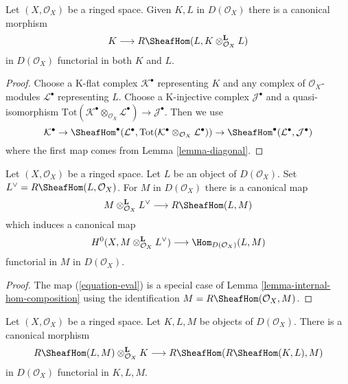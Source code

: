\begin{lemma}
\label{lemma-internal-hom-diagonal}
Let $(X, \mathcal{O}_X)$ be a ringed space. Given $K, L$ in $D(\mathcal{O}_X)$
there is a canonical morphism
$$
K \longrightarrow R\SheafHom(L, K \otimes_{\mathcal{O}_X}^\mathbf{L} L)
$$
in $D(\mathcal{O}_X)$ functorial in both $K$ and $L$.
\end{lemma}

\begin{proof}
Choose a K-flat complex $\mathcal{K}^\bullet$ representing $K$
and any complex of $\mathcal{O}_X$-modules $\mathcal{L}^\bullet$
representing $L$. Choose a K-injective complex $\mathcal{J}^\bullet$
and a quasi-isomorphism
$\text{Tot}(\mathcal{K}^\bullet \otimes_{\mathcal{O}_X} \mathcal{L}^\bullet)
\to \mathcal{J}^\bullet$. Then we use
$$
\mathcal{K}^\bullet \to
\SheafHom^\bullet(\mathcal{L}^\bullet,
\text{Tot}(\mathcal{K}^\bullet \otimes_{\mathcal{O}_X} \mathcal{L}^\bullet))
\to
\SheafHom^\bullet(\mathcal{L}^\bullet, \mathcal{J}^\bullet)
$$
where the first map comes from Lemma \ref{lemma-diagonal}.
\end{proof}

\begin{lemma}
\label{lemma-dual}
Let $(X, \mathcal{O}_X)$ be a ringed space. Let $L$ be an
object of $D(\mathcal{O}_X)$. Set $L^\vee = R\SheafHom(L, \mathcal{O}_X)$.
For $M$ in $D(\mathcal{O}_X)$ there is a canonical map
\begin{equation}
\label{equation-eval}
M \otimes^\mathbf{L}_{\mathcal{O}_X} L^\vee
\longrightarrow
R\SheafHom(L, M)
\end{equation}
which induces a canonical map
$$
H^0(X, M \otimes^\mathbf{L}_{\mathcal{O}_X} L^\vee)
\longrightarrow
\Hom_{D(\mathcal{O}_X)}(L, M)
$$
functorial in $M$ in $D(\mathcal{O}_X)$.
\end{lemma}

\begin{proof}
The map (\ref{equation-eval}) is a special case of
Lemma \ref{lemma-internal-hom-composition}
using the identification $M = R\SheafHom(\mathcal{O}_X, M)$.
\end{proof}

\begin{lemma}
\label{lemma-internal-hom-evaluate}
Let $(X, \mathcal{O}_X)$ be a ringed space. Let $K, L, M$ be objects of
$D(\mathcal{O}_X)$. There is a canonical morphism
$$
R\SheafHom(L, M) \otimes_{\mathcal{O}_X}^\mathbf{L} K
\longrightarrow
R\SheafHom(R\SheafHom(K, L), M)
$$
in $D(\mathcal{O}_X)$ functorial in $K, L, M$.
\end{lemma}

